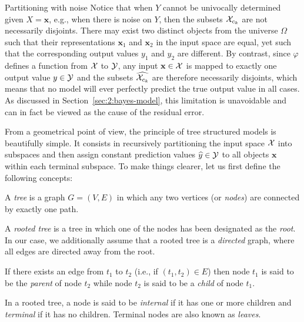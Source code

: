 \begin{remark}{Partitioning with noise}
Notice that when $Y$ cannot be univocally determined given $X=\mathbf{x}$,
e.g., when there is noise on $Y$, then the subsets ${\cal X}_{c_k}$ are not
necessarily disjoints. There may exist two distinct objects from the universe $\Omega$ such
that their representations $\mathbf{x}_1$ and $\mathbf{x}_2$ in the input space
are equal, yet such that the corresponding output values $y_1$ and $y_2$ are different.
By contrast, since $\varphi$ defines a function from ${\cal X}$ to ${\cal Y}$,
any input $\mathbf{x} \in {\cal X}$ is mapped to exactly one output value $y \in
{\cal Y}$ and the subsets $\widehat{{\cal X}_{c_k}}$ are therefore necessarily
disjoints, which means that no model will ever perfectly predict the true output
value in all cases. As discussed in Section~\ref{sec:2:bayes-model}, this
limitation is unavoidable and can in fact be viewed as the cause of the residual error.
\end{remark}

From a geometrical point of view, the principle of tree structured models is
beautifully simple. It consists in recursively partitioning the input space
${\cal X}$ into subspaces and then assign constant prediction values
$\widehat{y}\in{\cal Y}$ to all objects $\mathbf{x}$ within each terminal
subspace. To make things clearer, let us first define the following concepts:

\begin{definition}
A \emph{tree} is a graph $G=(V,E)$ in which any two vertices (or \emph{nodes})
are connected by exactly one path.
\end{definition}

\begin{definition}
A \emph{rooted tree} is a tree in which one of the nodes has been designated as
the \emph{root}. In our case, we additionally assume that a rooted tree is a
\emph{directed} graph, where all edges are directed away from the root.
\end{definition}

\begin{definition}
If there exists an edge from $t_1$ to $t_2$ (i.e., if $(t_1, t_2)\in E$) then
node $t_1$ is said to be the \emph{parent} of node $t_2$ while node $t_2$ is
said to be a \emph{child} of node $t_1$.
\end{definition}

\begin{definition}
In a rooted tree, a node is said to be \emph{internal} if it has one or more
children and \emph{terminal} if it has no children. Terminal nodes are also
known as \emph{leaves}.
\end{definition}


